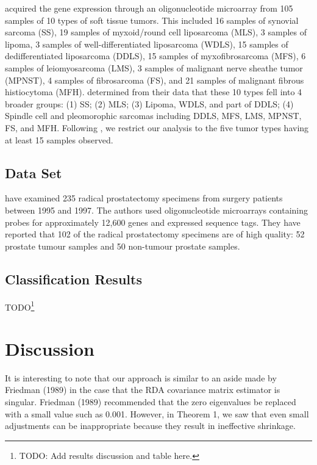 \documentclass[11pt]{article}
\begin{document}
\cite{Nakayama:2007fl} acquired the gene expression through an oligonucleotide microarray from 105 samples of 10 types of soft tissue tumors. This included 16 samples of synovial sarcoma (SS), 19 samples of myxoid/round cell liposarcoma (MLS), 3 samples of lipoma, 3 samples of well-differentiated liposarcoma (WDLS), 15 samples of dedifferentiated liposarcoma (DDLS), 15 samples of myxofibrosarcoma (MFS), 6 samples of leiomyosarcoma (LMS), 3 samples of malignant nerve sheathe tumor (MPNST), 4 samples of fibrosarcoma (FS), and 21 samples of malignant fibrous histiocytoma (MFH). \cite{Nakayama:2007fl} determined from their data that these 10 types fell into 4 broader groups: (1) SS; (2) MLS; (3) Lipoma, WDLS, and part of DDLS; (4) Spindle cell and pleomorophic sarcomas including DDLS, MFS, LMS, MPNST, FS, and MFH. Following \cite{Witten:2011kc}, we restrict our analysis to the five tumor types having at least 15 samples observed.

\subsection{\cite{Singh:2002fh} Data Set}

\cite{Singh:2002fh} have examined 235 radical prostatectomy specimens from surgery patients between 1995 and 1997. The authors used oligonucleotide microarrays containing probes for approximately 12,600 genes and expressed sequence tags. They have reported that 102 of the radical prostatectomy specimens are of high quality: 52 prostate tumour samples and 50 non-tumour prostate samples.

\subsection{Classification Results}

TODO\footnote{TODO: Add results discussion and table here.}


\section{Discussion}

It is interesting to note that our approach is similar to an aside made by Friedman (1989) in the case that the RDA covariance matrix estimator is singular. Friedman (1989) recommended that the zero eigenvalues be replaced with a small value such as 0.001. However, in Theorem 1, we saw that even small adjustments can be inappropriate because they result in ineffective shrinkage.
	



\end{document}
